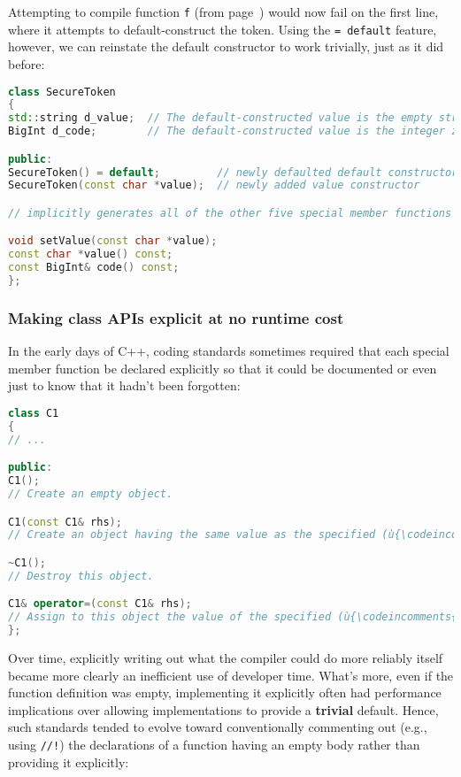 \noindent Attempting to compile function \texttt{f} (from page~\pageref{default-voidf-code}) would now fail on the
first line, where it attempts to default-construct the token. Using
the \texttt{=}~\texttt{default} feature, however, we can reinstate the
default constructor to work trivially, just as
it did before:

\begin{lstlisting}[language=C++]
class SecureToken
{
std::string d_value;  // The default-constructed value is the empty string.
BigInt d_code;        // The default-constructed value is the integer zero.

public:
SecureToken() = default;         // newly defaulted default constructor
SecureToken(const char *value);  // newly added value constructor

// implicitly generates all of the other five special member functions

void setValue(const char *value);
const char *value() const;
const BigInt& code() const;
};
\end{lstlisting}


\subsubsection[Making class APIs explicit at no runtime cost]{Making class APIs explicit at no runtime cost}\label{making-class-apis-explicit-at-no-runtime-cost}

In the early days of C++, coding standards sometimes
required that each special member function be declared explicitly so
that it could be documented or even just to know that it hadn't been
forgotten:

\begin{lstlisting}[language=C++]
class C1
{
// ...

public:
C1();
// Create an empty object.

C1(const C1& rhs);
// Create an object having the same value as the specified (ù{\codeincomments{rhs}}ù) object.

~C1();
// Destroy this object.

C1& operator=(const C1& rhs);
// Assign to this object the value of the specified (ù{\codeincomments{rhs}}ù) object.
};
\end{lstlisting}

\noindent Over time, explicitly writing out what the compiler
could do more reliably itself became more clearly an inefficient use of developer time.
What's more, even if the function definition was empty, implementing it
explicitly often had performance implications over allowing
implementations to provide a \textbf{trivial} default. Hence, such
standards tended to evolve toward conventionally commenting out (e.g.,
using \texttt{//!}) the declarations of a function having an empty
body rather than providing it explicitly:

